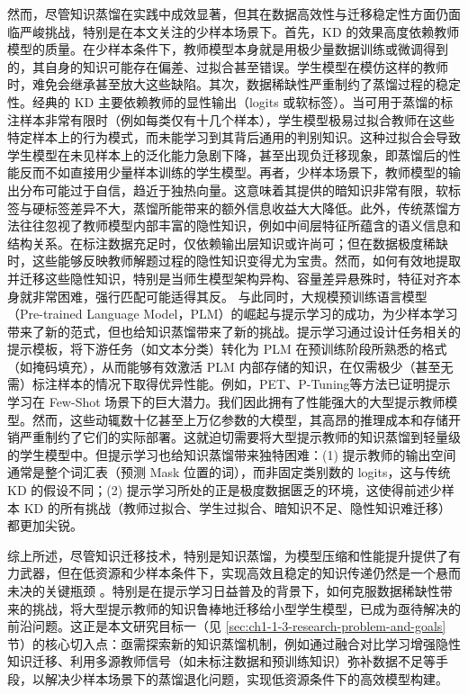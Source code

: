 \documentclass[../main.tex]{subfiles}
\begin{document}
然而，尽管知识蒸馏在实践中成效显著，但其在数据高效性与迁移稳定性方面仍面临严峻挑战，特别是在本文关注的少样本场景下。首先，KD 的效果高度依赖教师模型的质量\cite{distillingknowledgeneural_hinton_2015,knowledgedistillationsurvey_gou_2021}。在少样本条件下，教师模型本身就是用极少量数据训练或微调得到的，其自身的知识可能存在偏差、过拟合甚至错误。学生模型在模仿这样的教师时，难免会继承甚至放大这些缺陷。其次，数据稀缺性严重制约了蒸馏过程的稳定性。经典的 KD 主要依赖教师的显性输出（logits 或软标签）。当可用于蒸馏的标注样本非常有限时（例如每类仅有十几个样本），学生模型极易过拟合教师在这些特定样本上的行为模式，而未能学习到其背后通用的判别知识。这种过拟合会导致学生模型在未见样本上的泛化能力急剧下降，甚至出现负迁移现象，即蒸馏后的性能反而不如直接用少量样本训练的学生模型。再者，少样本场景下，教师模型的输出分布可能过于自信，趋近于独热向量。这意味着其提供的暗知识非常有限，软标签与硬标签差异不大，蒸馏所能带来的额外信息收益大大降低。此外，传统蒸馏方法往往忽视了教师模型内部丰富的隐性知识，例如中间层特征所蕴含的语义信息和结构关系。在标注数据充足时，仅依赖输出层知识或许尚可；但在数据极度稀缺时，这些能够反映教师解题过程的隐性知识变得尤为宝贵。然而，如何有效地提取并迁移这些隐性知识，特别是当师生模型架构异构、容量差异悬殊时，特征对齐本身就非常困难，强行匹配可能适得其反。
与此同时，大规模预训练语言模型（Pre-trained Language Model，PLM）的崛起\cite{bertpretraining_devlin_2019,robertarobustlyoptimized_liu_2019,makingpretrained_gao_2021}与提示学习\cite{exploitingclozequestions_schick_2021,ptuningv2_liu_2021}的成功，为少样本学习带来了新的范式，但也给知识蒸馏带来了新的挑战。提示学习通过设计任务相关的提示模板，将下游任务（如文本分类）转化为 PLM 在预训练阶段所熟悉的格式（如掩码填充），从而能够有效激活 PLM 内部存储的知识，在仅需极少（甚至无需）标注样本的情况下取得优异性能。例如，PET\cite{exploitingclozequestions_schick_2021}、P-Tuning\cite{ptuningv2_liu_2021}等方法已证明提示学习在 Few-Shot 场景下的巨大潜力。我们因此拥有了性能强大的大型提示教师模型。然而，这些动辄数十亿甚至上万亿参数的大模型，其高昂的推理成本和存储开销严重制约了它们的实际部署。这就迫切需要将大型提示教师的知识蒸馏到轻量级的学生模型中。但提示学习也给知识蒸馏带来独特困难\cite{prefixtuningoptimizing_li_2021,powerscaleparameter_lester_2021,exploitingclozequestions_schick_2021,ptuningv2_liu_2021}：(1) 提示教师的输出空间通常是整个词汇表（预测 Mask 位置的词），而非固定类别数的 logits，这与传统 KD 的假设不同；(2) 提示学习所处的正是极度数据匮乏的环境，这使得前述少样本 KD 的所有挑战（教师过拟合、学生过拟合、暗知识不足、隐性知识难迁移）都更加尖锐。

综上所述，尽管知识迁移技术，特别是知识蒸馏，为模型压缩和性能提升提供了有力武器，但在低资源和少样本条件下，实现高效且稳定的知识传递仍然是一个悬而未决的关键瓶颈 。特别是在提示学习日益普及的背景下，如何克服数据稀缺性带来的挑战，将大型提示教师的知识鲁棒地迁移给小型学生模型，已成为亟待解决的前沿问题。这正是本文研究目标一（见 \ref{sec:ch1-1-3-research-problem-and-goals} 节）的核心切入点：亟需探索新的知识蒸馏机制，例如通过融合对比学习增强隐性知识迁移、利用多源教师信号（如未标注数据和预训练知识）弥补数据不足等手段，以解决少样本场景下的蒸馏退化问题，实现低资源条件下的高效模型构建。
\end{document}
